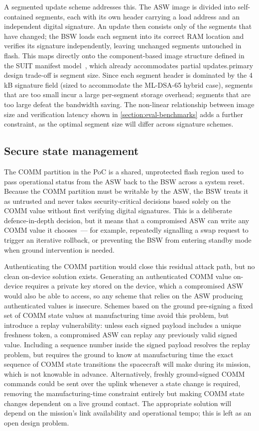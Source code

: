 A segmented update scheme addresses this. The ASW image is divided into self-contained segments, each with its own header carrying a load address and an independent digital signature. An update then consists only of the segments that have changed; the BSW loads each segment into its correct RAM location and verifies its signature independently, leaving unchanged segments untouched in flash. This maps directly onto the component-based image structure defined in the SUIT manifest model~\cite{rfc9019,rfc9124}, which already accommodates partial updates.\n\nThe primary design trade-off is segment size. Since each segment header is dominated by the 4\,kB signature field (sized to accommodate the ML-DSA-65 hybrid case), segments that are too small incur a large per-segment storage overhead; segments that are too large defeat the bandwidth saving. The non-linear relationship between image size and verification latency shown in \autoref{section:eval-benchmarks} adds a further constraint, as the optimal segment size will differ across signature schemes.

\subsection{Secure state management}
\label{subsection:conclusion-futureWork-secureState}

The COMM partition in the PoC is a shared, unprotected flash region used to pass operational status from the ASW back to the BSW across a system reset. Because the COMM partition must be writable by the ASW, the BSW treats it as untrusted and never takes security-critical decisions based solely on the COMM value without first verifying digital signatures. This is a deliberate defence-in-depth decision, but it means that a compromised ASW can write any COMM value it chooses~--- for example, repeatedly signalling a swap request to trigger an iterative rollback, or preventing the BSW from entering standby mode when ground intervention is needed.

Authenticating the COMM partition would close this residual attack path, but no clean on-device solution exists. Generating an authenticated COMM value on-device requires a private key stored on the device, which a compromised ASW would also be able to access, so any scheme that relies on the ASW producing authenticated values is insecure. Schemes based on the ground pre-signing a fixed set of COMM state values at manufacturing time avoid this problem, but introduce a replay vulnerability: unless each signed payload includes a unique freshness token, a compromised ASW can replay any previously valid signed value. Including a sequence number inside the signed payload resolves the replay problem, but requires the ground to know at manufacturing time the exact sequence of COMM state transitions the spacecraft will make during its mission, which is not knowable in advance. Alternatively, freshly ground-signed COMM commands could be sent over the uplink whenever a state change is required, removing the manufacturing-time constraint entirely but making COMM state changes dependent on a live ground contact. The appropriate solution will depend on the mission's link availability and operational tempo; this is left as an open design problem.


